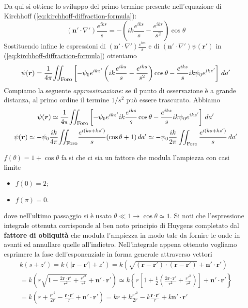 Da qui si ottiene lo sviluppo del primo termine presente nell'equazione di Kirchhoff (\ref{eq:kirchhoff-diffraction-formula}):
\[
	(\bm{n}' \cdot \nabla')\frac{e^{iks}}{s} = -\left(ik\frac{e^{iks}}{s}-\frac{e^{iks}}{s^2}\right) \cos \theta
\]
Sostituendo infine le espressioni di $(\bm{n}' \cdot \nabla ') \frac{e^{iks}}{s}$ e di
$(\bm{n}' \cdot \nabla')\psi(\bm{r'})$ in (\ref{eq:kirchhoff-diffraction-formula}) otteniamo
\[
	\psi(\bm{r}) = \frac{1}{4 \pi} \mathlarger{\iint_{\text{Foro}}} \left[-\psi_0 e^{ikz'}\left( ik\frac{e^{iks}}{s}-\frac{e^{iks}}{s^2}\right) \cos \theta - \frac{e^{iks}}{s} ik\psi_0 e^{ikz'} \right] \, da'
\]
Compiamo la seguente \emph{approssimazione}: se il punto di osservazione
è a grande distanza, al primo ordine il termine \(1/s^2\) può essere
trascurato.
Abbiamo
\begin{gather*}
	\psi(\bm{r}) \simeq \frac{1}{4 \pi} \mathlarger{\iint_{\text{Foro}}} \left[-\psi_0 e^{ikz'} ik\frac{e^{iks}}{s}
	\cos \theta - \frac{e^{iks}}{s}ik\psi_0 e^{ikz'} \right]\, da'\\
	\psi(\bm{r}) \simeq -\psi_0 \frac{ik}{4 \pi} \mathlarger{\iint_{\text{Foro}}} \frac{e^{i(ks+kz')}}{s}(\cos \theta + 1)\,
	da' \simeq -\psi_0 \frac{ik}{2 \pi} \iint_{\text{Foro}} \frac{e^{i(ks+kz')}}{s}\,da'
\end{gather*}
\marginnote
{ $f(\theta) = 1 + \cos \theta$ fa si che ci sia un fattore che modula l'ampiezza con casi limite
	\begin{itemize}
		\item $f(0) = 2$;
		\item $f(\pi) = 0$.
	\end{itemize}
}
dove nell'ultimo passaggio si è usato
\(\theta \ll 1 \rightarrow \cos \theta \simeq 1\).
Si noti che
l'espressione integrale ottenuta corrisponde al ben noto principio di
Huygens completato dal \textbf{fattore di obliquità} che modula
l'ampiezza in modo tale da fornire le onde in avanti ed annullare quelle
all'indietro.
Nell'integrale appena ottenuto vogliamo esprimere la fase dell'esponenziale in forma generale attraverso vettori
\begin{gather*}
	k(s + z') = k(|\bm{r}-\bm{r'}|+z') = k \left(\sqrt{(\bm{r}-\bm{r'})\cdot(\bm{r}-\bm{r'})}+\bm{n}' \cdot \bm{r'}\right)\\
	= k\left(r \sqrt{1 - \frac{2 \bm{r}\cdot \bm{r'}}{r^2} + \frac{r'^2}{r^2}} + \bm{n}' \cdot \bm{r'}\right)
	\simeq k \left\{ r  \left[ 1 + \frac{1}{2} \left( \frac{2 \bm{r}\cdot \bm{r'}}{r^2} + \frac{r'^2}{r^2}\right) \right]
	+ \bm{n}' \cdot \bm{r'} \right\} \\
	=  k\left( r + \frac{r'^2}{2r} - \frac{ \bm{r}\cdot \bm{r'}}{r} + \bm{n}' \cdot \bm{r'}\right)
	= k r + k \frac{r'^2}{2r} - k \frac{ \bm{r}\cdot \bm{r'}}{r} + k \bm{n}' \cdot \bm{r'}
\end{gather*}
